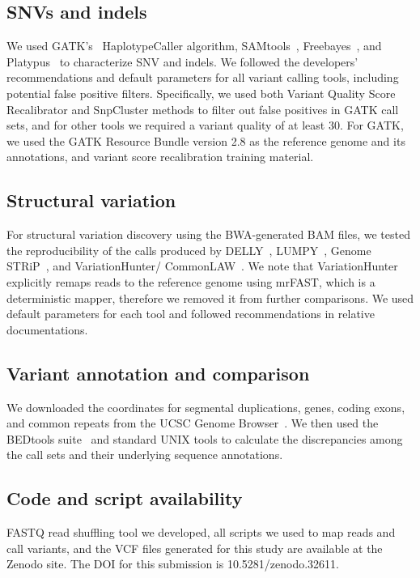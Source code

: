 \documentclass{bioinfo}
\begin{document}
\begin{methods}
\vspace*{-0.3cm}
\subsection*{SNVs and indels}

We used GATK's~\citep{DePristo2011} HaplotypeCaller algorithm, SAMtools~\citep{Li2009b}, Freebayes~\citep{Garrison2012}, and Platypus~\citep{Rimmer2014} to characterize
SNV and indels. We followed the developers' recommendations and default parameters for all variant calling tools, including potential false positive filters. 
Specifically, we used both Variant Quality Score Recalibrator and SnpCluster methods to filter out false positives in GATK call sets, and for other tools
we required a variant quality of at least 30.
For GATK, we used the GATK Resource Bundle version 2.8 as the reference genome and its annotations, and variant score recalibration training material.

\vspace*{-0.3cm}
\subsection*{Structural variation}

For structural variation discovery using the BWA-generated BAM files, we tested the reproducibility of the calls produced by DELLY~\citep{Rausch2012}, LUMPY~\citep{Layer2014}, Genome STRiP~\citep{Handsaker2015}, and VariationHunter/ CommonLAW~\citep{Hormozdiari2009,Hormozdiari2011b}. We note that VariationHunter explicitly remaps reads to the reference genome using mrFAST, which is a deterministic mapper, therefore we removed it from further comparisons.
We used default parameters for each tool and followed recommendations in relative documentations.

\vspace*{-0.3cm}
\subsection*{Variant annotation and comparison}

We downloaded the coordinates for segmental duplications, genes, coding exons, and common repeats from the UCSC Genome Browser~\citep{Kent2002}. 
We then used the BEDtools suite~\citep{Quinlan2010a} and standard UNIX tools 
 to calculate the discrepancies among the call sets and their underlying sequence annotations.

\vspace*{-0.3cm}
\subsection*{Code and script availability} FASTQ read shuffling tool we developed, all scripts we used to map reads and call variants,
and the VCF files generated for this study are available at the Zenodo site. The DOI for this submission is 10.5281/zenodo.32611.


\end{methods}
\end{document}
